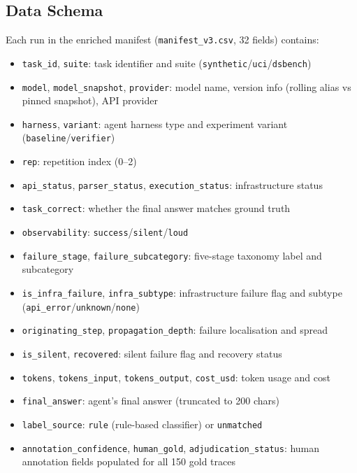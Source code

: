 \subsection{Data Schema}

Each run in the enriched manifest (\texttt{manifest\_v3.csv}, 32 fields) contains:

\begin{itemize}[leftmargin=*,itemsep=1pt]
\item \texttt{task\_id}, \texttt{suite}: task identifier and suite (\texttt{synthetic}/\texttt{uci}/\texttt{dsbench})
\item \texttt{model}, \texttt{model\_snapshot}, \texttt{provider}: model name, version info (rolling alias vs pinned snapshot), API provider
\item \texttt{harness}, \texttt{variant}: agent harness type and experiment variant (\texttt{baseline}/\texttt{verifier})
\item \texttt{rep}: repetition index (0--2)
\item \texttt{api\_status}, \texttt{parser\_status}, \texttt{execution\_status}: infrastructure status
\item \texttt{task\_correct}: whether the final answer matches ground truth
\item \texttt{observability}: \texttt{success}/\texttt{silent}/\texttt{loud}
\item \texttt{failure\_stage}, \texttt{failure\_subcategory}: five-stage taxonomy label and subcategory
\item \texttt{is\_infra\_failure}, \texttt{infra\_subtype}: infrastructure failure flag and subtype (\texttt{api\_error}/\texttt{unknown}/\texttt{none})
\item \texttt{originating\_step}, \texttt{propagation\_depth}: failure localisation and spread
\item \texttt{is\_silent}, \texttt{recovered}: silent failure flag and recovery status
\item \texttt{tokens}, \texttt{tokens\_input}, \texttt{tokens\_output}, \texttt{cost\_usd}: token usage and cost
\item \texttt{final\_answer}: agent's final answer (truncated to 200 chars)
\item \texttt{label\_source}: \texttt{rule} (rule-based classifier) or \texttt{unmatched}
\item \texttt{annotation\_confidence}, \texttt{human\_gold}, \texttt{adjudication\_status}: human annotation fields populated for all 150 gold traces
\end{itemize}

